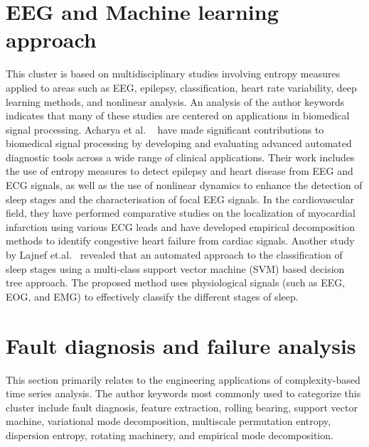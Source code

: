\section{EEG and Machine learning approach}\label{Sec:ReviewTopicEEG}

This cluster is based on multidisciplinary studies involving entropy measures applied to areas such as EEG, epilepsy, classification, heart rate variability, deep learning methods, and nonlinear analysis. An analysis of the author keywords indicates that many of these studies are centered on applications in biomedical signal processing. 
Acharya et al. ~\cite{Acharya2015a, Acharya2015, Acharya2017, Acharya2016, Acharya2019,  Acharya2017a, Acharya2018} have made significant contributions to biomedical signal processing by developing and evaluating advanced automated diagnostic tools across a wide range of clinical applications. Their work includes the use of entropy measures to detect epilepsy and heart disease from EEG and ECG signals, as well as the use of nonlinear dynamics to enhance the detection of sleep stages and the characterisation of focal EEG signals. In the cardiovascular field, they have performed comparative studies on the localization of myocardial infarction using various ECG leads and have developed empirical decomposition methods to identify congestive heart failure from cardiac
signals. Another study by Lajnef et.al.~\cite{Lajnef2015} revealed that an automated approach to the classification of sleep stages using a multi-class support vector machine (SVM) based decision tree approach. The proposed method uses physiological signals (such as EEG, EOG, and EMG) to effectively classify the different stages of sleep.

\section{Fault diagnosis and failure analysis}\label{Sec:ReviewTopicFault}
This section primarily relates to the engineering applications of complexity-based time series analysis. The author keywords most commonly used to categorize this cluster include fault diagnosis, feature extraction, rolling bearing, support vector machine, variational mode decomposition, multiscale permutation entropy, dispersion entropy, rotating machinery, and empirical mode decomposition. 

